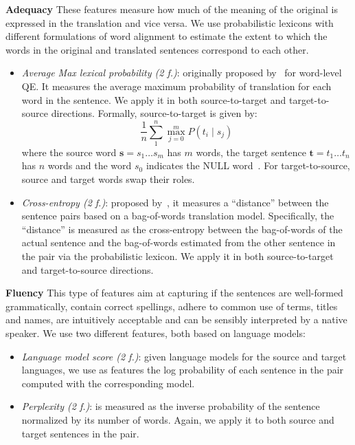 \textbf{Adequacy} These features measure how much of the meaning of the original is expressed in the translation and vice versa. We use probabilistic lexicons with different formulations of word alignment to estimate the extent to which the words in the original and translated sentences correspond to each other. 
\begin{itemize}
\item \textit{Average Max lexical probability (2 f.)}: originally proposed by~\cite{Ueffing05} for word-level QE. It measures the average maximum probability of translation for each word in the sentence. We apply it in both source-to-target and target-to-source directions. Formally, source-to-target is given by:
$$ \frac{1}{n}\sum_1^n\max_{j=0}^m P(t_i\mid s_j) $$
where the source word $\mathbf{s}=s_1\ldots s_m$ has $m$ words, the target sentence $\mathbf{t}=t_1\ldots t_n$ has $n$ words and the word $s_0$ indicates the NULL word~\cite{Brown93}. For target-to-source, source and target words swap their roles.
\item \textit{Cross-entropy (2 f.)}: proposed by~\cite{Hainan17}, it measures a ``distance'' between the sentence pairs based on a bag-of-words translation model. Specifically, the ``distance'' is measured as the cross-entropy between the bag-of-words of the actual sentence and the bag-of-words estimated from the other sentence in the pair via the probabilistic lexicon. We apply it in both source-to-target and target-to-source directions.
\end{itemize}

\textbf{Fluency} This type of features aim at capturing if the sentences are well-formed grammatically, contain correct spellings, adhere to common use of terms, titles and names, are intuitively acceptable and can be sensibly interpreted by a native speaker. We use two different features, both based on language models:
\begin{itemize}
\item \textit{Language model score (2 f.)}: given language models for the source and target languages, we use as features the log probability of each sentence in the pair computed with the corresponding model.
\item \textit{Perplexity (2 f.)}: is measured as the inverse probability of the sentence normalized by its number of words. Again, we apply it to both source and target sentences in the pair.
\end{itemize}

